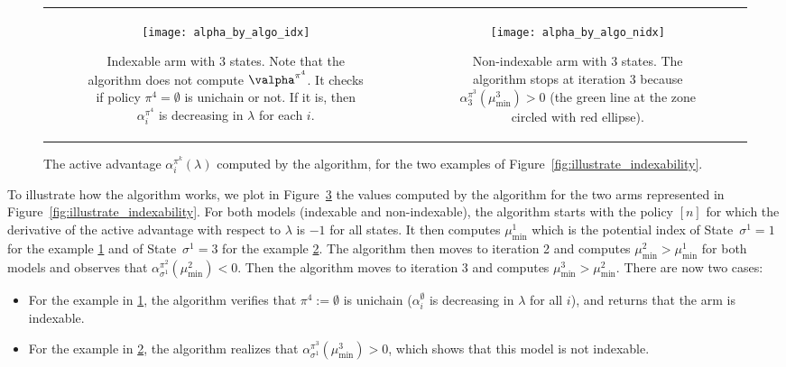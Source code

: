 \begin{figure}[ht]
    \begin{tabular}{cc}
        \begin{subfigure}[t]{0.48\linewidth}
            \texttt{[image: alpha\_by\_algo\_idx]}
            \caption{Indexable arm with $3$ states. Note that the algorithm does not compute $\valpha^{\pi^4}$. It checks if policy $\pi^4=\emptyset$ is unichain or not. If it is, then $\alpha^{\pi^4}_i$ is decreasing in $\lambda$ for each $i$.}
            \label{fig:illustrate_algo_ind}
        \end{subfigure}
        &\begin{subfigure}[t]{0.48\linewidth}
            \texttt{[image: alpha\_by\_algo\_nidx]}
            \caption{Non-indexable arm with $3$ states. The algorithm stops at iteration $3$ because $\alpha^{\pi^3}_3(\mu^3_{\min})>0$ (the green line at the zone circled with red ellipse).}
            \label{fig:illustrate_algo_nind}
        \end{subfigure}            
    \end{tabular}
    \caption{
        The active advantage $\alpha^{\pi^k}_i(\lambda)$ computed by the algorithm, for the two examples of Figure~\ref{fig:illustrate_indexability}.
    }
    \label{fig:illustrate_algo}
\end{figure}

\medskip

To illustrate how the algorithm works, we plot in Figure~\ref{fig:illustrate_algo} the values computed by the algorithm for the two arms represented in Figure~\ref{fig:illustrate_indexability}. For both models (indexable and non-indexable), the algorithm starts with the policy $[n]$ for which the derivative of the active advantage with respect to $\lambda$ is $-1$ for all states. It then computes $\mu^1_{\min}$ which is the potential index of State~$\sigma^1=1$ for the example \ref{fig:illustrate_algo_ind} and of State~$\sigma^1=3$ for the example \ref{fig:illustrate_algo_nind}. The algorithm then moves to iteration 2 and computes $\mu^2_{\min}>\mu^1_{\min}$ for both models and observes that $\alpha^{\pi^2}_{\sigma^1}(\mu^2_{\min})<0$. Then the algorithm moves to iteration $3$ and computes $\mu^3_{\min}>\mu^2_{\min}$. There are now two cases: 
\begin{itemize}
    \item For the example in \ref{fig:illustrate_algo_ind}, the algorithm verifies that $\pi^4:=\emptyset$ is unichain ($\alpha^{\emptyset}_i$ is decreasing in $\lambda$ for all $i$), and returns that the arm is indexable.
    \item For the example in \ref{fig:illustrate_algo_nind}, the algorithm realizes that $\alpha^{\pi^3}_{\sigma^1}(\mu^3_{\min})>0$, which shows that this model is not indexable. 
\end{itemize}

